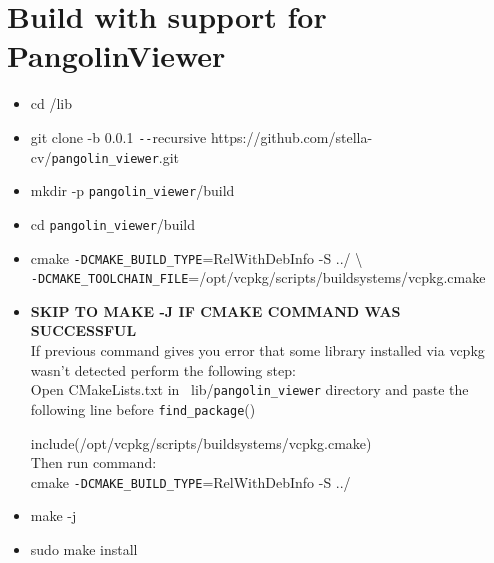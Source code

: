 \documentclass[a4paper,12pt]{book}
\begin{document}
\section{Build with support for PangolinViewer}
\begin{itemize}
	\item cd \texttildelow/lib
	\item git clone -b 0.0.1 \texttt{-{}-}recursive https://github.com/stella-cv/\verb|pangolin_viewer|.git
	\item mkdir -p \verb|pangolin_viewer|/build
	\item cd \verb|pangolin_viewer|/build
	\item cmake \verb|-DCMAKE_BUILD_TYPE|=RelWithDebInfo -S ../ \textbackslash \\ \verb|-DCMAKE_TOOLCHAIN_FILE|=/opt/vcpkg/scripts/buildsystems/vcpkg.cmake
	\item \textbf{SKIP TO MAKE -J IF CMAKE COMMAND WAS SUCCESSFUL}\\ 
	If previous command gives you error that some library installed via vcpkg wasn't detected perform the following step:\\
	Open CMakeLists.txt in ~lib/\verb|pangolin_viewer| directory and paste the following line before \verb|find_package|()
	
	\vspace{1mm}
	include(/opt/vcpkg/scripts/buildsystems/vcpkg.cmake)\\
	
	Then run command:\\
	cmake \verb|-DCMAKE_BUILD_TYPE|=RelWithDebInfo -S ../
	
	\item make -j
	\item sudo make install
\end{itemize}
\end{document}
